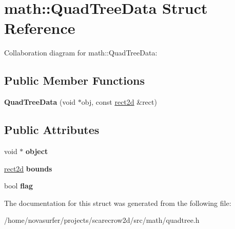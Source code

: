 \hypertarget{structmath_1_1QuadTreeData}{}\section{math\+:\+:Quad\+Tree\+Data Struct Reference}
\label{structmath_1_1QuadTreeData}


Collaboration diagram for math\+:\+:Quad\+Tree\+Data\+:
\subsection*{Public Member Functions}
\begin{DoxyCompactItemize}
\item 
\mbox{\label{structmath_1_1QuadTreeData_a7c3182a7e326751bc339c18d6660571d}} 
{\bfseries Quad\+Tree\+Data} (void $\ast$obj, const \hyperlink{structmath_1_1rect2d}{rect2d} \&rect)
\end{DoxyCompactItemize}
\subsection*{Public Attributes}
\begin{DoxyCompactItemize}
\item 
\mbox{\label{structmath_1_1QuadTreeData_ab0dc4a5b878c81d4f8ab0eb7d1cbd22a}} 
void $\ast$ {\bfseries object}
\item 
\mbox{\label{structmath_1_1QuadTreeData_af07af2ba2e8651d8069a924148943866}} 
\hyperlink{structmath_1_1rect2d}{rect2d} {\bfseries bounds}
\item 
\mbox{\label{structmath_1_1QuadTreeData_ab59d5d953f4b2bb5359695bc817068d0}} 
bool {\bfseries flag}
\end{DoxyCompactItemize}


The documentation for this struct was generated from the following file\+:\begin{DoxyCompactItemize}
\item 
/home/novasurfer/projects/scarecrow2d/src/math/quadtree.\+h\end{DoxyCompactItemize}
